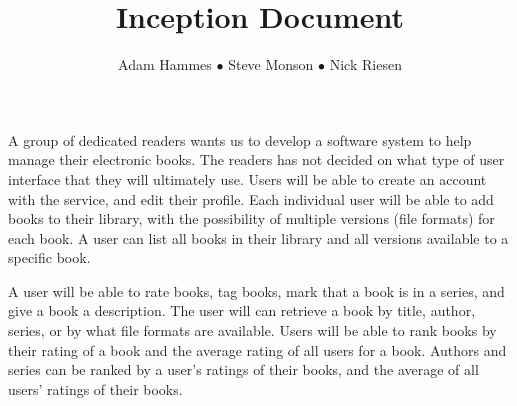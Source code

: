 \documentclass{article}
\title{Inception Document}
\author{Adam Hammes $\bullet$ Steve Monson $\bullet$ Nick Riesen}
\begin{document}
\maketitle

A group of dedicated readers wants us to develop a software system to help manage their electronic books.
The readers has not decided on what type of user interface that they will ultimately use.
Users will be able to create an account with the service, and edit their profile.
Each individual user will be able to add books to their library, with the possibility of multiple versions (file formats) for each book.
A user can list all books in their library and all versions available to a specific book.

A user will be able to rate books, tag books, mark that a book is in a series, and give a book a description.
The user will can retrieve a book by title, author, series, or by what file formats are available.
Users will be able to rank books by their rating of a book and the average rating of all users for a book.
Authors and series can be ranked by a user's ratings of their books, and the average of all users' ratings of their books.
\end{document}
